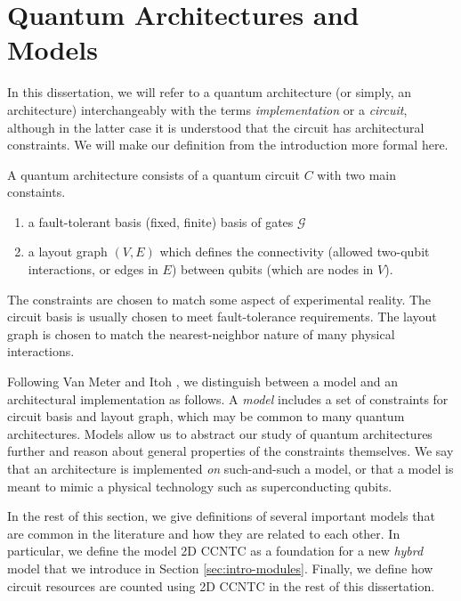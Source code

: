 \section{Quantum Architectures and Models}
\label{sec:intro-arch}

In this dissertation, we will refer to a quantum architecture (or simply,
an architecture) interchangeably with the terms \emph{implementation} 
or a \emph{circuit}, although in the latter case it is understood that the
circuit has architectural constraints. We will make our definition from
the introduction more formal here.

\begin{definition}
A quantum architecture consists of a quantum circuit $C$ with
two main constaints.

\begin{enumerate}
\item a fault-tolerant basis (fixed, finite) basis of
gates $\mathcal{G}$
\item a layout graph $(V,E)$ which defines the connectivity (allowed two-qubit
interactions, or edges in $E$) between qubits (which are nodes in $V$).
\end{enumerate}
\end{definition}

The constraints are chosen to match some aspect of experimental reality.
The circuit basis is usually chosen to meet fault-tolerance requirements.
The layout graph is chosen to match the nearest-neighbor nature of
many physical interactions.

Following Van Meter and Itoh \cite{VanMeter2005},
we distinguish between a model and an architectural implementation as follows.
A \emph{model} includes a set of constraints for circuit basis and layout
graph, which may be common to many quantum architectures. Models allow us
to abstract our study of quantum architectures further and reason about
general properties of the constraints themselves.
We say that an architecture is implemented \emph{on} such-and-such a model,
or that a model is meant to mimic a physical technology such as
superconducting qubits.

In the rest of this section, we give definitions of
several important models that are common in the literature and how they are
related to each other.
In particular, we define the
model \textsf{2D CCNTC} as a foundation for a new \emph{hybrd}
model that we
introduce in Section \ref{sec:intro-modules}. Finally, we define how
circuit resources are counted using \textsf{2D CCNTC} in the rest of this
dissertation.

